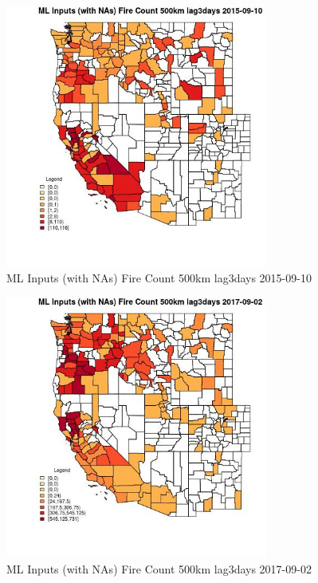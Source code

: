 \begin{figure} 
\centering  
\includegraphics[width=0.77\textwidth]{Code_Outputs/Report_ML_input_PM25_Step4_part_e_de_duplicated_aves_compiled_2019-05-20wNAs_CountyFire_Count_500km_lag3daysMean2015-09-10.jpg} 
\caption{\label{fig:Report_ML_input_PM25_Step4_part_e_de_duplicated_aves_compiled_2019-05-20wNAsCountyFire_Count_500km_lag3daysMean2015-09-10}ML Inputs (with NAs) Fire Count 500km lag3days 2015-09-10} 
\end{figure} 
 

\begin{figure} 
\centering  
\includegraphics[width=0.77\textwidth]{Code_Outputs/Report_ML_input_PM25_Step4_part_e_de_duplicated_aves_compiled_2019-05-20wNAs_CountyFire_Count_500km_lag3daysMean2017-09-02.jpg} 
\caption{\label{fig:Report_ML_input_PM25_Step4_part_e_de_duplicated_aves_compiled_2019-05-20wNAsCountyFire_Count_500km_lag3daysMean2017-09-02}ML Inputs (with NAs) Fire Count 500km lag3days 2017-09-02} 
\end{figure} 
 

